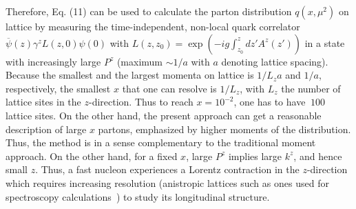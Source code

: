 \documentclass[aps,prd,preprint,tightenlines,superscriptaddress]{revtex4}
\begin{document}
Therefore, Eq. (11) can be used to calculate the parton distribution $q(x,\mu^2)$ on lattice by measuring
the time-independent, non-local quark correlator $\overline{\psi}(z)\gamma^zL(z,0)\psi(0)$ with
$L(z,z_0) = \exp\left(-ig\int^{z}_{z_0} dz' A^z(z') \right)$ in a state with increasingly large $P^z$
(maximum $\sim 1/a$ with $a$ denoting lattice spacing). 
Because the smallest and the largest momenta on lattice is $1/L_z a$ and $1/a$, respectively,
the smallest $x$ that one can resolve is $1/L_z$, with $L_z$ the number of lattice sites in the $z$-direction.
Thus to reach $x = 10^{-2}$, one has to have $~100$ lattice sites. On the other hand, the present approach can get a
reasonable description of large $x$ partons, emphasized by higher moments of the distribution. Thus, the method is
in a sense complementary to the traditional moment approach. On the other hand, for a fixed $x$, large $P^z$ implies large $k^z$,
and hence small $z$. Thus, a fast nucleon experiences a Lorentz contraction in the $z$-direction which requires
increasing resolution (anistropic lattices such as ones used for spectroscopy calculations~\cite{Edwards:2011jj}) to study its longitudinal structure.
\end{document}
